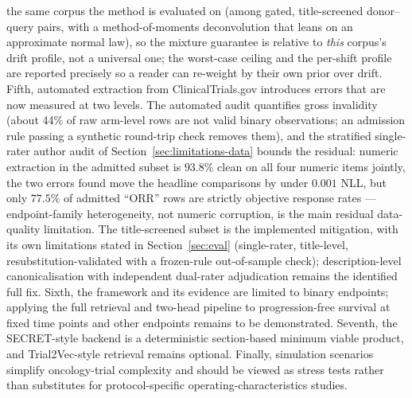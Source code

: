 \documentclass[11pt]{article}
\begin{document}
the same corpus the method is evaluated on (among gated, title-screened
donor--query pairs, with a method-of-moments deconvolution that leans on an
approximate normal law), so the mixture guarantee is relative to
\emph{this} corpus's drift profile, not a universal one; the worst-case
ceiling and the per-shift profile are reported precisely so a reader can
re-weight by their own prior over drift. Fifth, automated extraction from ClinicalTrials.gov introduces errors
that are now measured at two levels. The automated audit quantifies gross
invalidity (about 44\% of raw arm-level rows are not valid binary
observations; an admission rule passing a synthetic round-trip check removes
them), and the stratified single-rater author audit of Section~\ref{sec:limitations-data}
bounds the residual: numeric extraction in the admitted subset is
$93.8\%$ clean on all four numeric items jointly, the two errors found move
the headline comparisons by under $0.001$ NLL, but only $77.5\%$ of admitted
``ORR'' rows are strictly objective response rates --- endpoint-family
heterogeneity, not numeric corruption, is the main residual data-quality
limitation. The title-screened subset is the implemented mitigation, with
its own limitations stated in Section~\ref{sec:eval} (single-rater,
title-level, resubstitution-validated with a frozen-rule out-of-sample
check); description-level canonicalisation with independent dual-rater
adjudication remains the identified full fix.
Sixth, the framework and its evidence are limited to binary endpoints;
applying the full retrieval and two-head pipeline to progression-free survival
at fixed time points and other endpoints remains to be demonstrated. Seventh, the SECRET-style
backend is a deterministic section-based minimum viable product, and
Trial2Vec-style retrieval remains optional. Finally, simulation scenarios
simplify oncology-trial complexity and should be viewed as stress tests rather
than substitutes for protocol-specific operating-characteristics studies.
\end{document}
